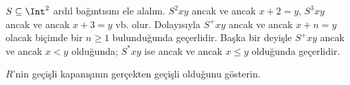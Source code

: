 \begin{ex}
$S \subseteq \Int^2$ ardıl bağıntısını ele alalım. $S^2xy$ ancak ve ancak
$x+2=y$, $S^3xy$ ancak ve ancak $x+3=y$ vb. olur. Dolayısıyla $S^+xy$ ancak
ve ancak $x+n=y$ olacak biçimde bir $n\geq 1$ bulunduğunda geçerlidir. Başka bir deyişle
$S^+xy$ ancak ve ancak $x<y$ olduğunda; $S^*xy$ ise ancak ve ancak $x\le y$
olduğunda geçerlidir.
\end{ex}

\begin{prob}
$R$'nin geçişli kapanışının gerçekten geçişli olduğunu gösterin.
\end{prob}

